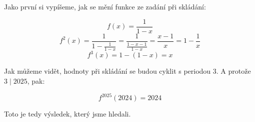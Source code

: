 \documentclass{fkssolpub}
\author{Ondřej Sedláček}
\begin{document}
Jako první si vypíšeme, jak se mění funkce ze zadání při skládání:

\[
	f(x) = \frac{1}{1 - x}
\]
\[
	f^2(x) = \frac{1}{1 - \frac{1}{1-x}} = \frac{1}{\frac{1 - x - 1}{1 - x}} = \frac{x - 1}{x} = 1 - \frac{1}{x}
\]
\[
	f^3(x) = 1 - (1 - x) = x
\]

Jak můžeme vidět, hodnoty při skládání se budou cyklit s periodou 3. A protože $3 \mid 2025$, pak:

\[
	f^{2025}(2024) = 2024
\]

Toto je tedy výsledek, který jsme hledali.
\end{document}
